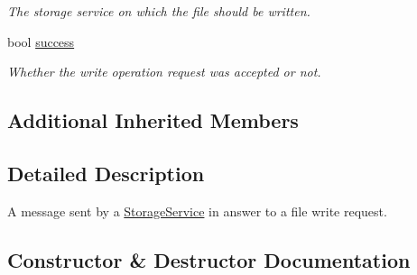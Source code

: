 \begin{DoxyCompactItemize}
\begin{DoxyCompactList}\small\item\em The storage service on which the file should be written. \end{DoxyCompactList}\item 
\mbox{\label{classwrench_1_1_storage_service_file_write_answer_message_ac9808808da262acae22aa726be7d0b9b}} 
bool \hyperlink{classwrench_1_1_storage_service_file_write_answer_message_ac9808808da262acae22aa726be7d0b9b}{success}
\begin{DoxyCompactList}\small\item\em Whether the write operation request was accepted or not. \end{DoxyCompactList}\end{DoxyCompactItemize}
\subsection*{Additional Inherited Members}


\subsection{Detailed Description}
A message sent by a \hyperlink{classwrench_1_1_storage_service}{Storage\+Service} in answer to a file write request. 

\subsection{Constructor \& Destructor Documentation}
\mbox{\label{classwrench_1_1_storage_service_file_write_answer_message_a96a9062ac69725d994532e9574249ac1}} 
